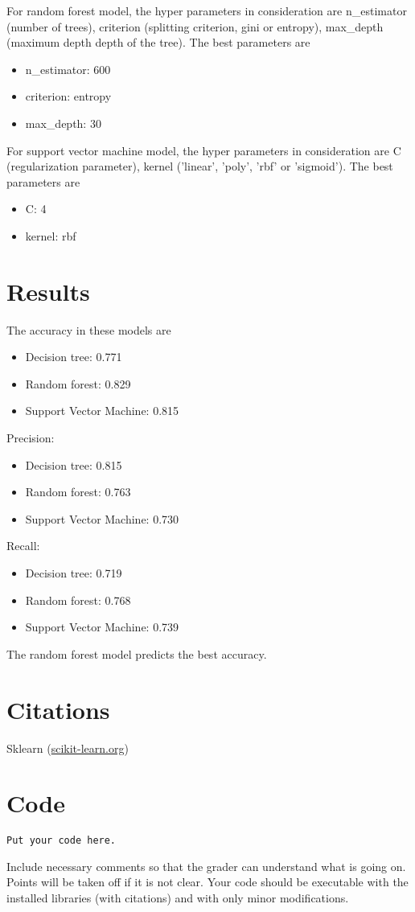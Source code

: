 \documentclass[12pt]{article}
\theoremstyle{definition}
\begin{document}
For random forest model, the hyper parameters in consideration are n\_estimator (number of trees), criterion (splitting criterion, gini or entropy), max\_depth (maximum depth depth of the tree). The best parameters are
\begin{itemize}
    \item n\_estimator: 600
    \item criterion: entropy
    \item max\_depth: 30
\end{itemize}

For support vector machine model, the hyper parameters in consideration are C (regularization parameter), kernel ('linear', 'poly', 'rbf' or 'sigmoid'). The best parameters are
\begin{itemize}
    \item C: 4
    \item kernel: rbf
\end{itemize}

\section{Results}
The accuracy in these models are 
\begin{itemize}
    \item Decision tree: 0.771
    \item Random forest: 0.829
    \item Support Vector Machine: 0.815
\end{itemize}

Precision:
\begin{itemize}
    \item Decision tree: 0.815
    \item Random forest: 0.763
    \item Support Vector Machine: 0.730
\end{itemize}

Recall:
\begin{itemize}
    \item Decision tree: 0.719
    \item Random forest: 0.768
    \item Support Vector Machine: 0.739
\end{itemize}

The random forest model predicts the best accuracy.



\section*{Citations}
Sklearn (\href{}{scikit-learn.org})


\section*{Code}
\begin{lstlisting}
Put your code here.
\end{lstlisting}
Include necessary comments so that the grader can understand what is going on. Points will be taken off if it is not clear. Your code should be executable with the installed libraries (with citations) and with only minor modifications.
\end{document}
